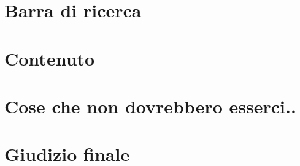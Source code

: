 \documentclass[a4paper, oneside, openany, dvipsnames, table]{article}
\begin{document}
		
	
\newpage
\section{Barra di ricerca}
	
	
\newpage
\section{Contenuto}
	

	
\newpage
\section{Cose che non dovrebbero esserci..}
	


\newpage
\section{Giudizio finale}
	

\newpage

	     \listoffigures
\end{document}
